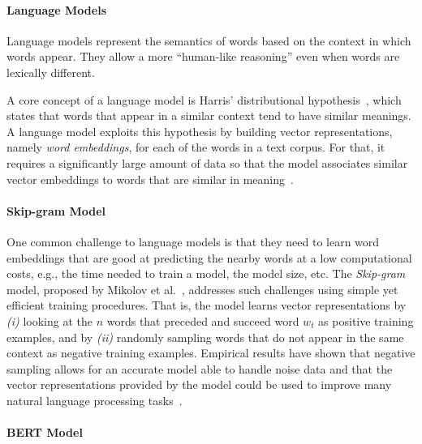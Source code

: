 \paragraph{\textbf{Language Models}}

Language models represent the semantics of words based on the context in which words appear. They allow a more ``human-like reasoning'' even when words are lexically different. 


A core concept of a language model is Harris' distributional hypothesis~\cite{harris1954distributional}, which states that words that appear in a similar context tend to have similar meanings. A language model exploits this hypothesis by building vector representations, namely \textit{word embeddings}, for each of the words in a text corpus.
For that, it requires a significantly large amount of data so that
the model associates similar vector embeddings to words that are similar in meaning~\cite{Ye2016}. 





\paragraph{\textbf{Skip-gram Model}}

One common challenge to language models is that they need to learn word embeddings that are good at predicting the nearby words at a low computational costs, e.g., the time needed to train a model, the model size, etc.
The \textit{Skip-gram} model, proposed by Mikolov et al.~\cite{Mikolov2013}, addresses such challenges using simple yet efficient training procedures. 
That is, the model learns vector representations by \textit{(i)} looking at the $n$ words that preceded and succeed word $w_t$
as positive training examples, and by \textit{(ii)} randomly sampling words that do not appear in the same context as negative training examples. 
Empirical results have shown that negative sampling allows for an accurate model able to handle noise data and that 
the vector representations provided by the model could be used to improve many natural language processing tasks~\cite{mikolov2013efficient}.






\paragraph{\textbf{BERT Model}}

